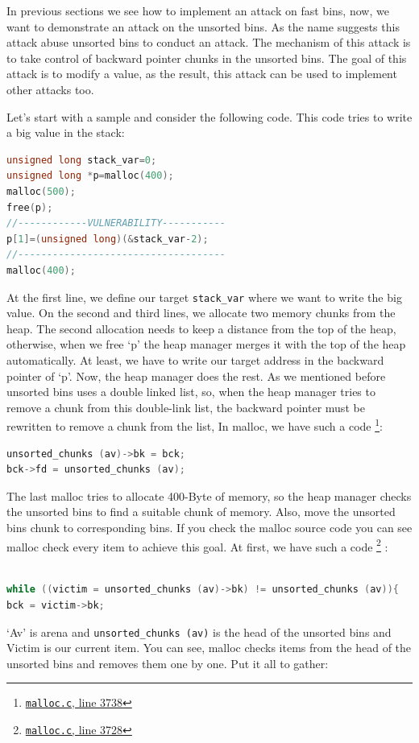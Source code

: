 \documentclass{masterthesis}
\newcommand*\fb{fast bins}
\newcommand*\ub{unsorted bins}
\begin{document}
In previous sections we see how to implement an attack on \fb{}, now, we want to demonstrate an attack on the \ub{}. As the name suggests this attack abuse \ub{} to conduct an attack. The mechanism of this attack is to take control of backward pointer chunks in the \ub{}. The goal of this attack is to modify a value, as the result, this attack can be used to implement other attacks too.

Let’s start with a sample and consider the following code. This code tries to write a big value in the stack:

\begin{lstlisting}[language=c,frame=tlrb]
unsigned long stack_var=0;
unsigned long *p=malloc(400);
malloc(500);
free(p);
//------------VULNERABILITY-----------
p[1]=(unsigned long)(&stack_var-2);
//------------------------------------
malloc(400);
\end{lstlisting}
 At the first line, we define our target \lstinline{stack_var} where we want to write the big value. On the second and third lines, we allocate two memory chunks from the heap. The second allocation needs to keep a distance from the top of the heap, otherwise, when we free ‘p’ the heap manager merges it with the top of the heap automatically. At least, we have to write our target address in the backward pointer of ‘p’. Now, the heap manager does the rest. As we mentioned before \ub{} uses a double linked list, so, when the heap manager tries to remove a chunk from this double-link list, the backward pointer must be rewritten to remove a chunk from the list, In malloc, we have such a code \footnote{\href{https://sourceware.org/git/?p=glibc.git;a=blob;f=malloc/malloc.c;h=f7cd29bc2f93e1082ee77800bd64a4b2a2897055;hb=9ea3686266dca3f004ba874745a4087a89682617\#l3738}{\texttt{malloc.c}, line 3738}}: 
 
\begin{lstlisting}[language=c,frame=tlrb]
unsorted_chunks (av)->bk = bck;
bck->fd = unsorted_chunks (av);
\end{lstlisting}

The last malloc tries to allocate 400-Byte of memory, so the heap manager checks the \ub{} to find a suitable chunk of memory. Also, move the \ub{} chunk to corresponding bins. If you check the malloc source code you can see malloc check every item to achieve this goal. At first, we have such a code \footnote{\href{https://sourceware.org/git/?p=glibc.git;a=blob;f=malloc/malloc.c;h=f7cd29bc2f93e1082ee77800bd64a4b2a2897055;hb=9ea3686266dca3f004ba874745a4087a89682617\#l3728}{\texttt{malloc.c}, line 3728}} :
\begin{lstlisting}[language=c,frame=tlrb]

while ((victim = unsorted_chunks (av)->bk) != unsorted_chunks (av)){
bck = victim->bk;
\end{lstlisting}
‘Av’ is arena and \lstinline{unsorted_chunks (av)} is the head of the \ub{} and Victim is our current item. You can see, malloc checks items from the head of the \ub{} and removes them one by one. Put it all to gather:
\end{document}
